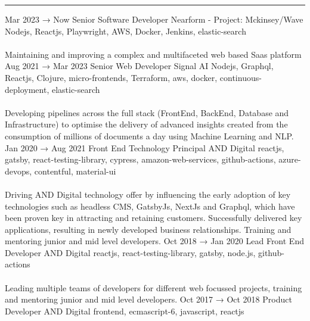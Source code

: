 \documentclass[9pt]{stackoverflow} %
\begin{document}
\textcolor{stackoverflow}{\hrule}
\vspace{4pt} %
\begin{tcolorbox}[blanker,width=0.75\textwidth,enlarge left by=0.25\textwidth,before skip=6pt,breakable,
	overlay unbroken and first={%
	  \node[inner sep=0pt,outer sep=0pt,text width=0.35\textwidth,
		align=none,
		below right]
		at ([xshift=-0.25\textwidth]frame.north west)
{
	\cvsect{Experience}
};}]
{\vspace{-16.3pt} %
	\small\begin{entrylist}
	\entry
		{Mar 2023 → Now}
		{Senior Software Developer}
		{Nearform - Project: Mckinsey/Wave}
		{{Nodejs,  Reactjs, Playwright, AWS, Docker, Jenkins, elastic-search}\\\\
		Maintaining and improving a complex and multifaceted web based Saas platform }
	\entry
		{Aug 2021 → Mar 2023}
		{Senior Web Developer}
		{Signal AI}
		{{Nodejs, Graphql, Reactjs, Clojure, micro-frontends, Terraform, aws, docker, continuous-deployment, elastic-search}\\\\
		Developing pipelines across the full stack (FrontEnd, BackEnd, Database and Infrastructure) to optimise the delivery of advanced insights created from the consumption of millions of documents a day using Machine Learning and NLP.
		}
	\entry
		{Jan 2020 → Aug 2021}
		{Front End Technology Principal}
		{AND Digital}
		{{reactjs, gatsby, react-testing-library, cypress, amazon-web-services, github-actions, azure-devops, contentful, material-ui}\\\\
		Driving AND Digital technology offer by influencing the early adoption of key technologies such as headless CMS, GatsbyJs, NextJs and Graphql, which have been proven key in attracting and retaining customers. Successfully delivered key applications, resulting in newly developed business relationships. Training and mentoring junior and mid level developers.}
	\entry
		{Oct 2018 → Jan 2020}
		{Lead Front End Developer}
		{AND Digital}
		{{reactjs, react-testing-library, gatsby, node.js, github-actions}\\\\
		Leading multiple teams of developers for different web focussed projects, training and mentoring junior and mid level developers.}
	\entry
		{Oct 2017 → Oct 2018}
		{Product Developer}
		{AND Digital}
		{{frontend, ecmascript-6, javascript, reactjs}\\\\
}
\end{entrylist}}
\end{tcolorbox}
\end{document}

